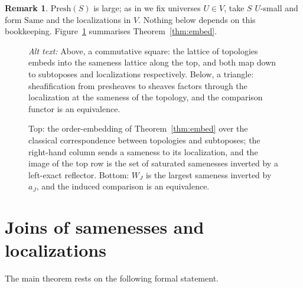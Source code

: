 \documentclass[11pt]{amsart}
\theoremstyle{definition}
\newtheorem{rem}[thm]{Remark}
\newcommand{\Same}{\mathrm{Same}}
\newcommand{\Top}{\mathrm{Top}}
\newcommand{\Presh}{\mathrm{Presh}}
\newcommand{\Sh}{\mathrm{Sh}}
\begin{document}
\begin{rem}
$\Presh(S)$ is large; as in \cite{SameA} we fix universes $U\in V$, take $S$
$U$-small and form $\Same$ and the localizations in $V$. Nothing below
depends on this bookkeeping. Figure~\ref{fig:embed} summarises
Theorem~\ref{thm:embed}.
\end{rem}

\begin{figure}[ht]
\centering
{}
\qquad
{}
\caption{Top: the order-embedding of Theorem~\ref{thm:embed} over the
classical correspondence between topologies and subtoposes; the right-hand
column sends a sameness to its localization, and the image of the top row is
the set of saturated samenesses inverted by a left-exact reflector. Bottom: $W_J$ is the
largest sameness inverted by $a_J$, and the induced comparison is an
equivalence.}
\label{fig:embed}
\par\smallskip\noindent\textit{Alt text:} Above, a commutative square: the
lattice of topologies embeds into the sameness lattice along the top, and
both map down to subtoposes and localizations respectively. Below, a
triangle: sheafification from presheaves to sheaves factors through the
localization at the sameness of the topology, and the comparison functor is
an equivalence.
\end{figure}

\section{Joins of samenesses and localizations}\label{sec:general}

The main theorem rests on the following formal statement.
\end{document}
